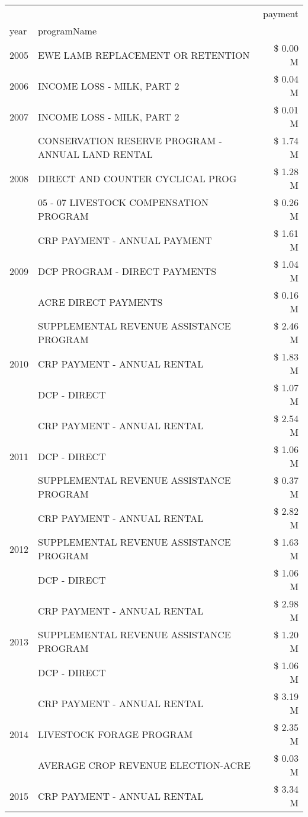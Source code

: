 \begin{tabular}{llr}
\toprule
 &  & payment \\
year & programName &  \\
\midrule
2005 & EWE LAMB REPLACEMENT OR RETENTION & \$ 0.00 M \\
\cline{1-3}
2006 & INCOME LOSS - MILK, PART 2 & \$ 0.04 M \\
\cline{1-3}
2007 & INCOME LOSS - MILK, PART 2 & \$ 0.01 M \\
\cline{1-3}
\multirow[t]{3}{*}{2008} & CONSERVATION RESERVE PROGRAM - ANNUAL LAND RENTAL & \$ 1.74 M \\
 & DIRECT AND COUNTER CYCLICAL PROG & \$ 1.28 M \\
 & 05 - 07 LIVESTOCK COMPENSATION PROGRAM & \$ 0.26 M \\
\cline{1-3}
\multirow[t]{3}{*}{2009} & CRP PAYMENT - ANNUAL PAYMENT & \$ 1.61 M \\
 & DCP PROGRAM - DIRECT PAYMENTS & \$ 1.04 M \\
 & ACRE DIRECT PAYMENTS & \$ 0.16 M \\
\cline{1-3}
\multirow[t]{3}{*}{2010} & SUPPLEMENTAL REVENUE ASSISTANCE PROGRAM & \$ 2.46 M \\
 & CRP PAYMENT - ANNUAL RENTAL & \$ 1.83 M \\
 & DCP - DIRECT & \$ 1.07 M \\
\cline{1-3}
\multirow[t]{3}{*}{2011} & CRP PAYMENT - ANNUAL RENTAL & \$ 2.54 M \\
 & DCP - DIRECT & \$ 1.06 M \\
 & SUPPLEMENTAL REVENUE ASSISTANCE PROGRAM & \$ 0.37 M \\
\cline{1-3}
\multirow[t]{3}{*}{2012} & CRP PAYMENT - ANNUAL RENTAL & \$ 2.82 M \\
 & SUPPLEMENTAL REVENUE ASSISTANCE PROGRAM & \$ 1.63 M \\
 & DCP - DIRECT & \$ 1.06 M \\
\cline{1-3}
\multirow[t]{3}{*}{2013} & CRP PAYMENT - ANNUAL RENTAL & \$ 2.98 M \\
 & SUPPLEMENTAL REVENUE ASSISTANCE PROGRAM & \$ 1.20 M \\
 & DCP - DIRECT & \$ 1.06 M \\
\cline{1-3}
\multirow[t]{3}{*}{2014} & CRP PAYMENT - ANNUAL RENTAL & \$ 3.19 M \\
 & LIVESTOCK FORAGE PROGRAM & \$ 2.35 M \\
 & AVERAGE CROP REVENUE ELECTION-ACRE & \$ 0.03 M \\
\cline{1-3}
\multirow[t]{2}{*}{2015} & CRP PAYMENT - ANNUAL RENTAL & \$ 3.34 M \\

\end{tabular}
